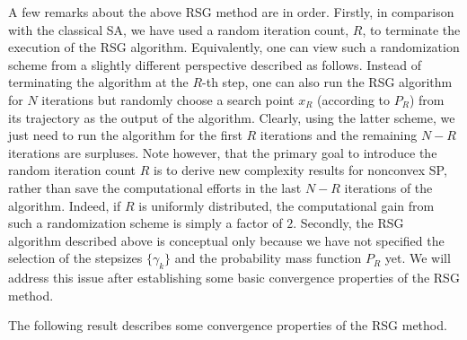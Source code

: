 \documentclass[final]{siamltex}
\def\vgap{\vspace*{.1in}}
\begin{document}
A few remarks about the above RSG method are in order.
Firstly, in comparison with the classical SA, we have used
a random iteration count, $R$, to terminate the execution of the RSG algorithm.
Equivalently, one can view such a randomization scheme from a slightly
different perspective described as follows. Instead of terminating
the algorithm at the $R$-th step, one can also run the RSG algorithm for $N$
iterations but randomly choose a search point $x_R$ (according to $P_R$) from its trajectory
as the output of the algorithm. Clearly, using the latter scheme, we just
need to run the algorithm for the first $R$ iterations and the remaining
$N - R$ iterations are surpluses. Note however, that the primary goal to
introduce the random iteration count $R$ is to derive new complexity results for
nonconvex SP, rather than save the computational efforts in the last $N-R$ iterations
of the algorithm. Indeed, if $R$ is uniformly distributed, %
the computational gain from such a randomization scheme is simply a factor of
$2$. Secondly, the RSG algorithm described above
is conceptual only because we have not specified the selection of the
stepsizes $\{\gamma_k\}$ and the probability mass function $P_R$ yet.
We will address this issue after establishing some basic convergence
properties of the RSG method.

\vgap

The following result describes some convergence properties of the RSG method.
\end{document}

